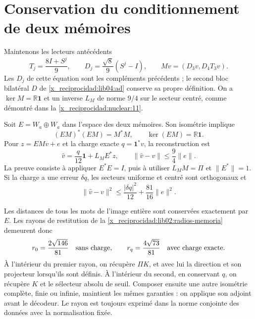 \section{Conservation du conditionnement de deux mémoires}
\label{x_reciprocidad:lib04:dos-memorias}

Maintenons les lecteurs antécédents
\begin{equation}
 T_j=\frac{8I+S^j}{9},\qquad
 D_j=\frac{\sqrt8}{9}(S^j-I),\qquad
 Mv=(D_3v,D_4T_3v).
 \label{x_reciprocidad:lib04:m-antecedente}
\end{equation}
Les \(D_j\) de cette équation sont les compléments précédents ; le second bloc bilatéral \(D\) de \eqref{x_reciprocidad:lib04:ad} conserve sa propre définition. On a \(\ker M=\mathbb R\mathbf1\) et un inverse \(L_M\) de norme \(9/4\) sur le secteur centré, comme démontré dans la \cref{x_reciprocidad:nuclear:11}.

Soit \(E=W_a\oplus W_a\) dans l’espace des deux mémoires.
Son isométrie implique
\begin{equation}
 (EM)^*(EM)=M^*M,\qquad
 \ker(EM)=\mathbb R\mathbf1.
 \label{x_reciprocidad:lib04:gram-m-preservado}
\end{equation}
Pour \(z=EMv+e\) et la charge exacte
\(q=\mathbf1^*v\), la reconstruction est
\begin{equation}
 \widehat v=\frac q{12}\mathbf1+L_ME^*z,\qquad
 \|\widehat v-v\|\leq\frac94\|e\|.
 \label{x_reciprocidad:lib04:inversa-m}
\end{equation}
La preuve consiste à appliquer \(E^*E=I\), puis à utiliser
\(L_MM=\Pi\) et \(\|E^*\|=1\). Si la charge a une erreur
\(\delta q\), les secteurs uniforme et centré sont orthogonaux et
\begin{equation}
 \|\widehat v-v\|^2
 \leq\frac{|\delta q|^2}{12}+\frac{81}{16}\|e\|^2.
 \label{x_reciprocidad:lib04:error-carga}
\end{equation}

Les distances de tous les mots de l’image entière sont conservées
exactement par \(E\). Les rayons de restitution de
la \cref{x_reciprocidad:lib02:radios-memoria} demeurent donc
\begin{equation}
 r_0=\frac{2\sqrt{146}}{81}\quad\hbox{sans charge},\qquad
 r_q=\frac{4\sqrt{73}}{81}\quad\hbox{avec charge exacte}.
 \label{x_reciprocidad:lib04:radios}
\end{equation}
À l'intérieur du premier rayon, on récupère \(\Pi K\), et avec lui la direction et son projecteur lorsqu'ils sont définis. À l'intérieur du second, en conservant \(q\), on récupère \(K\) et le sélecteur absolu de seuil. Composer ensuite une autre isométrie complète, finie ou infinie, maintient les mêmes garanties : on applique son adjoint avant le décodeur. Le rayon est toujours exprimé dans la norme conjointe des données avec la normalisation fixée.

